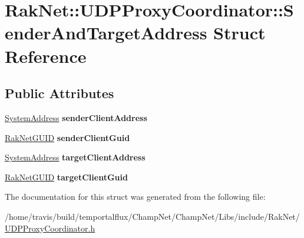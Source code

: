 \hypertarget{struct_rak_net_1_1_u_d_p_proxy_coordinator_1_1_sender_and_target_address}{\section{Rak\-Net\-:\-:U\-D\-P\-Proxy\-Coordinator\-:\-:Sender\-And\-Target\-Address Struct Reference}
\label{struct_rak_net_1_1_u_d_p_proxy_coordinator_1_1_sender_and_target_address}
}
\subsection*{Public Attributes}
\begin{DoxyCompactItemize}
\item 
\hypertarget{struct_rak_net_1_1_u_d_p_proxy_coordinator_1_1_sender_and_target_address_ae3a31e47330107e1ed410a4704e60d90}{\hyperlink{struct_rak_net_1_1_system_address}{System\-Address} {\bfseries sender\-Client\-Address}}\label{struct_rak_net_1_1_u_d_p_proxy_coordinator_1_1_sender_and_target_address_ae3a31e47330107e1ed410a4704e60d90}

\item 
\hypertarget{struct_rak_net_1_1_u_d_p_proxy_coordinator_1_1_sender_and_target_address_aee476f8a02cbbfa48b8f5f8102586c9f}{\hyperlink{struct_rak_net_1_1_rak_net_g_u_i_d}{Rak\-Net\-G\-U\-I\-D} {\bfseries sender\-Client\-Guid}}\label{struct_rak_net_1_1_u_d_p_proxy_coordinator_1_1_sender_and_target_address_aee476f8a02cbbfa48b8f5f8102586c9f}

\item 
\hypertarget{struct_rak_net_1_1_u_d_p_proxy_coordinator_1_1_sender_and_target_address_ae8ae45135a819d52fb59cbf0e12a38c0}{\hyperlink{struct_rak_net_1_1_system_address}{System\-Address} {\bfseries target\-Client\-Address}}\label{struct_rak_net_1_1_u_d_p_proxy_coordinator_1_1_sender_and_target_address_ae8ae45135a819d52fb59cbf0e12a38c0}

\item 
\hypertarget{struct_rak_net_1_1_u_d_p_proxy_coordinator_1_1_sender_and_target_address_af57158253137b5c37f2878e561c9b50e}{\hyperlink{struct_rak_net_1_1_rak_net_g_u_i_d}{Rak\-Net\-G\-U\-I\-D} {\bfseries target\-Client\-Guid}}\label{struct_rak_net_1_1_u_d_p_proxy_coordinator_1_1_sender_and_target_address_af57158253137b5c37f2878e561c9b50e}

\end{DoxyCompactItemize}


The documentation for this struct was generated from the following file\-:\begin{DoxyCompactItemize}
\item 
/home/travis/build/temportalflux/\-Champ\-Net/\-Champ\-Net/\-Libs/include/\-Rak\-Net/\hyperlink{_u_d_p_proxy_coordinator_8h}{U\-D\-P\-Proxy\-Coordinator.\-h}\end{DoxyCompactItemize}
